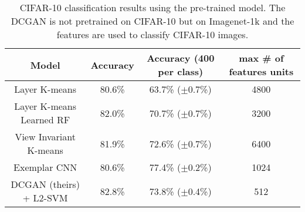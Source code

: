 \documentclass[10pt,twocolumn,letterpaper]{article}
\begin{document}
\begin{table*}
	\caption{CIFAR-10 classification results using the pre-trained model. The DCGAN is not pretrained on CIFAR-10 but on Imagenet-1k and the features are used to classify CIFAR-10 images.}\label{t1}
	\begin{center}
		\begin{tabular}{|c|c|c|c|}
			\hline
			Model & Accuracy & Accuracy (400 per class)& max \# of features units \\
			\hline
			Layer K-means & 80.6\% & 63.7\% ($\pm$0.7\%) & 4800 \\
			
			Layer K-means Learned RF & 82.0\% & 70.7\% ($\pm$0.7\%)& 3200 \\
			
			View Invariant K-means & 81.9\% & 72.6\% ($\pm$0.7\%)& 6400 \\
			
			Exemplar CNN & 80.6\% & 77.4\% ($\pm$0.2\%)& 1024 \\
			\hline
			DCGAN (theirs) + L2-SVM & 82.8\% & 73.8\% ($\pm$0.4\%)& 512 \\
			\hline
		\end{tabular}
	\end{center}
\end{table*}

{\small


}
\end{document}
